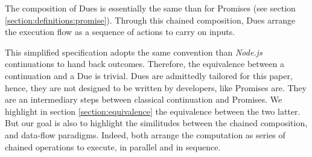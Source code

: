 The composition of Dues is essentially the same than for Promises (see section \ref{section:definitions:promise}).
Through this chained composition, Dues arrange the execution flow as a sequence of actions to carry on inputs.




This simplified specification adopts the same convention than \textit{Node.js} continuations to hand back outcomes.
Therefore, the equivalence between a continuation and a Due is trivial.
Dues are admittedly tailored for this paper, hence, they are not designed to be written by developers, like Promises are.
They are an intermediary steps between classical continuation and Promises.
We highlight in section \ref{section:equivalence} the equivalence between the two latter.
But our goal is also to highlight the similitudes between the chained composition, and data-flow paradigms.
Indeed, both arrange the computation as series of chained operations to execute, in parallel and in sequence.


